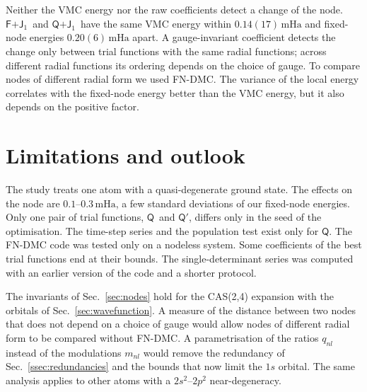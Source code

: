\documentclass[aps,prb,reprint,amsmath,amssymb,superscriptaddress,nofootinbib]{revtex4-2}
\newcommand{\mQ}{\ensuremath{\textsf{Q}}}
\newcommand{\mQb}{\ensuremath{\textsf{Q}'}}
\newcommand{\mQJ}{\ensuremath{\textsf{Q+J}_1}}
\newcommand{\mFJ}{\ensuremath{\textsf{F+J}_1}}
\newcommand{\mHa}{\,\mathrm{mHa}}
\begin{document}
Neither the VMC energy nor the raw coefficients detect a change of the node.
\mFJ\ and \mQJ\ have the same VMC energy within $0.14(17)\mHa$ and fixed-node
energies $0.20(6)\mHa$ apart. A gauge-invariant coefficient detects the change
only between trial functions with the same radial functions; across different
radial functions its ordering depends on the choice of gauge. To compare nodes
of different radial form we used FN-DMC. The variance of the local energy
correlates with the fixed-node energy better than the VMC energy, but it also
depends on the positive factor.


\section{Limitations and outlook}
\label{sec:limitations}

The study treats one atom with a quasi-degenerate ground state. The effects on
the node are $0.1$--$0.3\mHa$, a few standard deviations of our fixed-node
energies. Only one pair of trial functions, \mQ\ and \mQb, differs only in the
seed of the optimisation. The time-step series and the population test exist
only for \mQ. The FN-DMC code was tested only on a nodeless system. Some
coefficients of the best trial functions end at their bounds. The
single-determinant series was computed with an earlier version of the code and
a shorter protocol.

The invariants of Sec.~\ref{sec:nodes} hold for the CAS(2,4) expansion with
the orbitals of Sec.~\ref{sec:wavefunction}. A measure of the distance between
two nodes that does not depend on a choice of gauge would allow nodes of
different radial form to be compared without FN-DMC. A parametrisation of the
ratios $q_{nl}$ instead of the modulations $m_{nl}$ would remove the
redundancy of Sec.~\ref{ssec:redundancies} and the bounds that now limit the
$1s$ orbital. The same analysis applies to other atoms with a
$2s^2$--$2p^2$ near-degeneracy.
\end{document}

